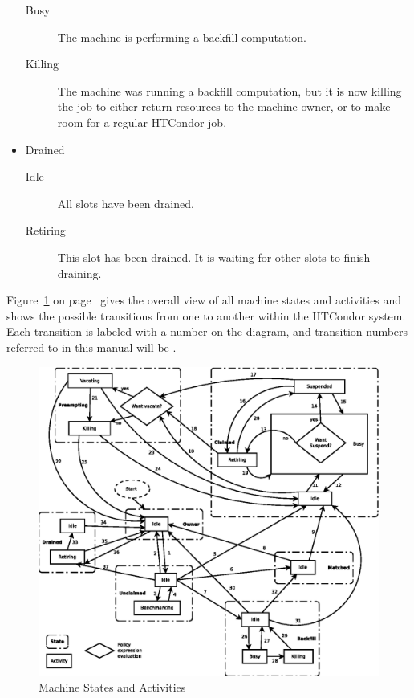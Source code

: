 \begin{itemize}
\begin{description}
\item[Busy] The machine is performing a backfill computation.

\item[Killing] The machine was running a backfill computation, but it
  is now killing the job to either return resources to the machine
  owner, or to make room for a regular HTCondor job.

\end{description}

\item Drained
\begin{description}

\item[Idle] All slots have been drained.

\item[Retiring] This slot has been drained.  It is waiting for other
  slots to finish draining.

\end{description}

\end{itemize}

Figure~\ref{fig:machine-activities} on
page~\pageref{fig:machine-activities} gives the overall view of all
machine states and activities and shows the possible transitions
from one to another within the HTCondor system.  
Each transition is labeled with a number on the diagram, and
transition numbers referred to in this manual will be .  

\begin{figure}[hbt]
\centering
\includegraphics{admin-man/activities.eps}
\caption{\label{fig:machine-activities}Machine States and Activities}
\end{figure}

